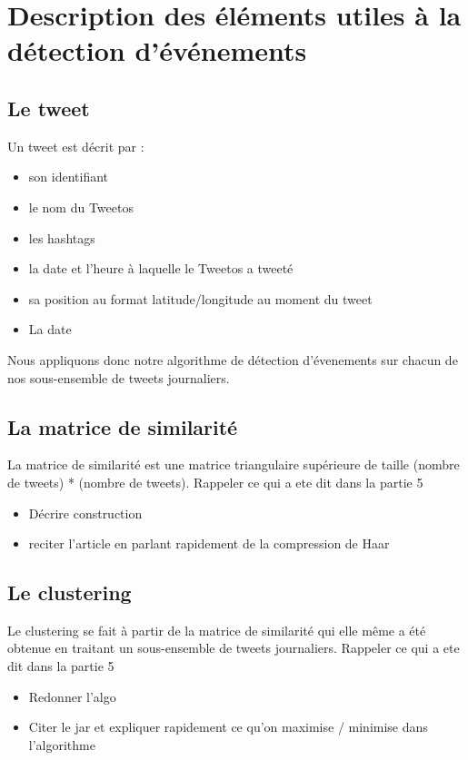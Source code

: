 \documentclass[12pt]{article}
\begin{document}
\newpage

\section{Description des \'el\'ements utiles \`a la d\'etection d'\'ev\'enements}

\subsection{Le tweet}
Un tweet est d\'ecrit par : 

\begin{itemize}
\item son identifiant
\item le nom du Tweetos
\item les hashtags
\item la date et l'heure \`a laquelle le Tweetos a tweet\'e
\item sa position au format latitude/longitude au moment du tweet
\item La date
\end{itemize}

Nous appliquons donc notre algorithme de d\'etection d'\'evenements sur chacun de nos sous-ensemble de tweets journaliers.

\subsection{La matrice de similarit\'e}
La matrice de similarit\'e est une matrice triangulaire sup\'erieure de taille (nombre de
tweets) * (nombre de tweets).
\newline
Rappeler ce qui a ete dit dans la partie 5
\begin{itemize}
	\item D\'ecrire construction
	\item reciter l'article en parlant rapidement de la compression de Haar
\end{itemize}

\subsection{Le clustering}
Le clustering se fait \`a partir de la matrice de similarit\'e qui elle m\^eme a \'et\'e obtenue en traitant 
un sous-ensemble de tweets journaliers.
\newline
Rappeler ce qui a ete dit dans la partie 5
\begin{itemize}
	\item Redonner l'algo
	\item Citer le jar et expliquer rapidement ce qu'on maximise / minimise dans l'algorithme
\end{itemize}
\end{document}
